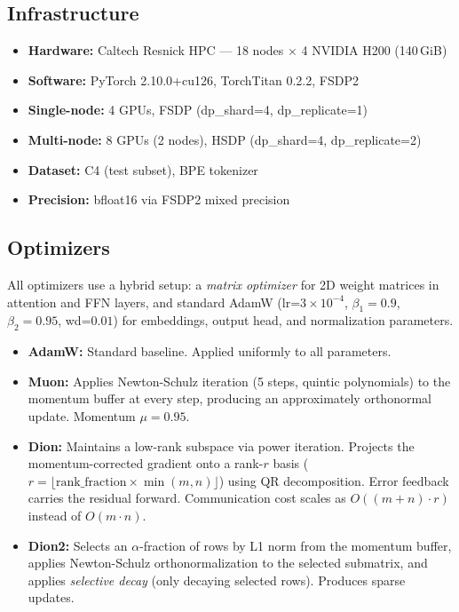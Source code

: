 \documentclass[11pt,a4paper]{article}
\begin{document}
\subsection{Infrastructure}
\begin{itemize}
    \item \textbf{Hardware:} Caltech Resnick HPC --- 18 nodes $\times$ 4 NVIDIA H200 (140\,GiB)
    \item \textbf{Software:} PyTorch 2.10.0+cu126, TorchTitan 0.2.2, FSDP2
    \item \textbf{Single-node:} 4 GPUs, FSDP (dp\_shard=4, dp\_replicate=1)
    \item \textbf{Multi-node:} 8 GPUs (2 nodes), HSDP (dp\_shard=4, dp\_replicate=2)
    \item \textbf{Dataset:} C4 (test subset), BPE tokenizer
    \item \textbf{Precision:} bfloat16 via FSDP2 mixed precision
\end{itemize}

\subsection{Optimizers}
All optimizers use a hybrid setup: a \emph{matrix optimizer} for 2D weight matrices in attention and FFN layers, and standard AdamW (lr=$3\times10^{-4}$, $\beta_1=0.9$, $\beta_2=0.95$, wd=$0.01$) for embeddings, output head, and normalization parameters.

\begin{itemize}
    \item \textbf{AdamW:} Standard baseline. Applied uniformly to all parameters.
    \item \textbf{Muon:} Applies Newton-Schulz iteration (5 steps, quintic polynomials) to the momentum buffer at every step, producing an approximately orthonormal update. Momentum $\mu = 0.95$.
    \item \textbf{Dion:} Maintains a low-rank subspace via power iteration. Projects the momentum-corrected gradient onto a rank-$r$ basis ($r = \lfloor \text{rank\_fraction} \times \min(m,n) \rfloor$) using QR decomposition. Error feedback carries the residual forward. Communication cost scales as $O((m+n) \cdot r)$ instead of $O(m \cdot n)$.
    \item \textbf{Dion2:} Selects an $\alpha$-fraction of rows by L1 norm from the momentum buffer, applies Newton-Schulz orthonormalization to the selected submatrix, and applies \emph{selective decay} (only decaying selected rows). Produces sparse updates.
\end{itemize}
\end{document}
